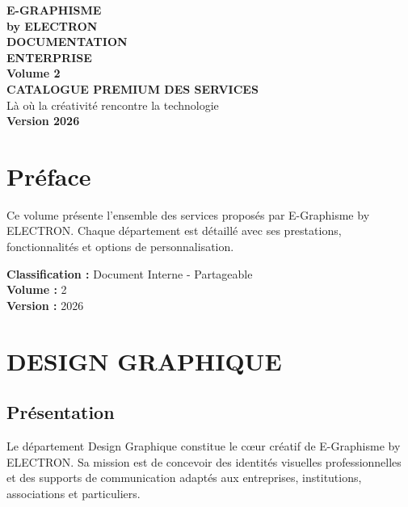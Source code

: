 \documentclass[12pt,a4paper,oneside]{book}
\begin{document}
\begin{titlepage}
\thispagestyle{empty}
\begin{center}
\vspace*{2cm}
{\Huge\bfseries\color{electronblue}E-GRAPHISME}\\[0.3cm]
{\LARGE\bfseries\color{electronpurple}by ELECTRON}\\[2cm]
\vspace{2cm}
{\huge\bfseries\color{darkbg}DOCUMENTATION}\\[0.3cm]
{\huge\bfseries\color{darkbg}ENTERPRISE}\\[1cm]
{\Large\bfseries\color{electroncyan}Volume 2}\\[0.5cm]
{\Large\bfseries\color{darkbg}CATALOGUE PREMIUM DES SERVICES}\\[3cm]
\vspace{2cm}
{\Large\color{mediumgray}Là où la créativité rencontre la technologie}\\[3cm]
{\Large\bfseries\color{electrongold}Version 2026}\\[2cm]
\vfill
\end{center}
\end{titlepage}

\frontmatter

\chapter*{Préface}
Ce volume présente l'ensemble des services proposés par E-Graphisme by ELECTRON. Chaque département est détaillé avec ses prestations, fonctionnalités et options de personnalisation.

\bigskip
\textbf{Classification :} Document Interne - Partageable\\
\textbf{Volume :} 2\\
\textbf{Version :} 2026

\tableofcontents

\mainmatter

\chapter{DESIGN GRAPHIQUE}

\section{Présentation}
Le département Design Graphique constitue le cœur créatif de E-Graphisme by ELECTRON. Sa mission est de concevoir des identités visuelles professionnelles et des supports de communication adaptés aux entreprises, institutions, associations et particuliers.
\end{document}
